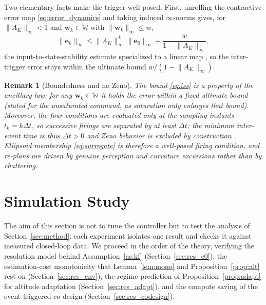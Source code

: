 \documentclass{ifacconf}
\newtheorem{remark}{Remark}
\begin{document}
Two elementary facts make the trigger well posed. First, unrolling the contractive error map
\eqref{eq:error_dynamics} and taking induced $\infty$-norms gives, for $\lVert A_K\rVert_\infty<1$ and
$\mathbf{w}_k\in\mathbb{W}$ with $\lVert\mathbf{w}_k\rVert_\infty\le\bar w$,
\begin{equation}
\lVert\mathbf{e}_k\rVert_\infty\le\lVert A_K\rVert_\infty^{\,k}\,\lVert\mathbf{e}_0\rVert_\infty
+\frac{\bar w}{1-\lVert A_K\rVert_\infty},
\label{eq:iss}
\end{equation}
the input-to-state-stability estimate specialized to a linear map \citep{jiangwang2001}, so the
inter-trigger error stays within the ultimate bound $\bar w/(1-\lVert A_K\rVert_\infty)$.

\begin{remark}[Boundedness and no Zeno]\label{rem:iss}
The bound \eqref{eq:iss} is a property of the ancillary law: for any $\mathbf{w}_k\in\mathbb{W}$ it holds
the error within a fixed ultimate bound (stated for the unsaturated command, as saturation only enlarges
that bound). Moreover, the four conditions are evaluated only at the sampling instants $t_k=k\Delta t$, so
successive firings are separated by at least $\Delta t$; the minimum inter-event time is thus $\Delta t>0$
and Zeno behavior is excluded by construction \citep{heemelsdonkersteel2013}. Ellipsoid membership
\eqref{eq:surrogate} is therefore a well-posed firing condition, and re-plans are driven by genuine
perception and curvature excursions rather than by chattering.
\end{remark}



\section{Simulation Study}
\label{sec:results}

The aim of this section is not to tune the controller but to test the analysis of
Section~\ref{sec:method}: each experiment isolates one result and checks it against measured
closed-loop data. We proceed in the order of the theory, verifying the resolution model behind
Assumption~\ref{as:kf} (Section~\ref{sec:res_e0}), the estimation-cost monotonicity that Lemma~\ref{lem:mono}
and Proposition~\ref{prop:alt} rest on (Section~\ref{sec:res_env}), the regime prediction of
Proposition~\ref{prop:adapt} for altitude adaptation (Section~\ref{sec:res_adapt}), and the compute
saving of the event-triggered co-design (Section~\ref{sec:res_codesign}).
\end{document}
